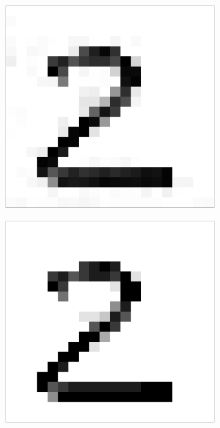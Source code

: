 \begin{figure}[h]
\centering
    \begin{subfigure}{0.2\textwidth}
        \includegraphics[width = \textwidth]{graphics/bins_inf}
    \end{subfigure}
    \begin{subfigure}{0.2\textwidth}
        \includegraphics[width = \textwidth]{graphics/bins_10}

\end{subfigure}
\end{figure}
